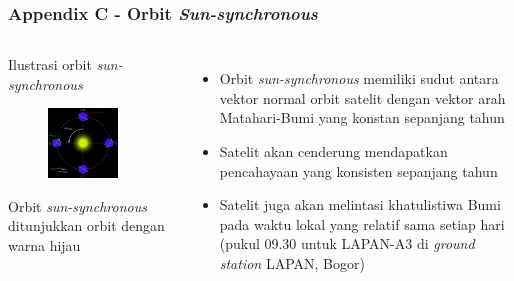 \documentclass[8pt]{beamer}
\begin{document}
\begin{frame}
  \frametitle{Appendix C - Orbit \textit{Sun-synchronous}}
  \begin{columns}[T]
    \begin{block}{Ilustrasi orbit \textit{sun-synchronous}}
      \begin{figure}
          \includegraphics[width=0.8\textwidth]{figure/sso.png}
      \end{figure}
      Orbit \textit{sun-synchronous} ditunjukkan orbit dengan warna hijau
    \end{block}
    \begin{itemize}
      \item Orbit \textit{sun-synchronous} memiliki sudut antara vektor normal orbit satelit dengan vektor arah Matahari-Bumi yang konstan sepanjang tahun
      \item Satelit akan cenderung mendapatkan pencahayaan yang konsisten sepanjang tahun
      \item Satelit juga akan melintasi khatulistiwa Bumi pada waktu lokal yang relatif sama setiap hari (pukul 09.30 untuk LAPAN-A3 di \textit{ground station} LAPAN, Bogor)
    \end{itemize}
  \end{columns}
\end{frame}
\end{document}
